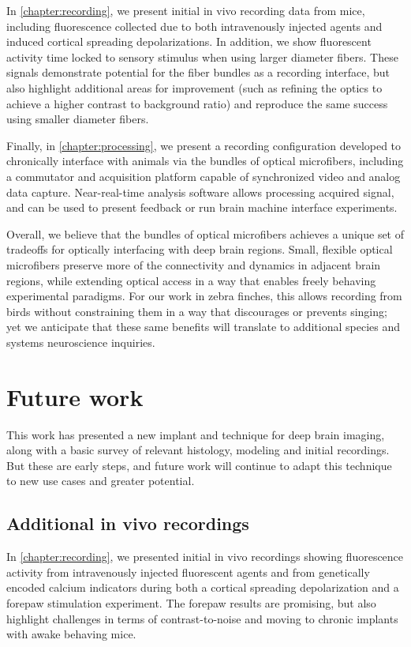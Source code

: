 In \cref{chapter:recording}, we present initial 
in vivo recording data from mice, including fluorescence 
collected due to both intravenously injected agents 
and induced cortical spreading depolarizations. 
In addition, we show fluorescent activity time 
locked to sensory stimulus when using larger diameter 
fibers. These signals demonstrate potential for the 
fiber bundles as a recording interface, but also 
highlight additional areas for improvement (such 
as refining the optics to achieve a higher 
contrast to background ratio) and 
reproduce the same success using smaller 
diameter fibers.

Finally, in \cref{chapter:processing}, we 
present a recording configuration developed to chronically 
interface with animals via the bundles of optical 
microfibers, including a commutator and acquisition 
platform capable of synchronized video and analog 
data capture. Near-real-time analysis software 
allows processing acquired signal, and can be 
used to present feedback or run brain machine 
interface experiments.

Overall, we believe that the bundles of optical 
microfibers achieves a unique set of tradeoffs 
for optically interfacing with deep brain regions. 
Small, flexible optical microfibers preserve 
more of the connectivity and dynamics in adjacent 
brain regions, while extending optical access in a 
way that enables freely behaving experimental 
paradigms. For our work in zebra finches, this 
allows recording from birds without constraining 
them in a way that discourages or prevents singing; 
yet we anticipate that these same benefits will 
translate to additional species and systems 
neuroscience inquiries.

\section{Future work}

This work has presented a new implant and technique
for deep brain imaging, along with a basic survey of 
relevant histology, modeling and initial recordings. 
But these are early steps, and future work will 
continue to adapt this technique to new use cases
and greater potential.

\subsection{Additional in vivo recordings}

In \cref{chapter:recording}, we presented initial 
in vivo recordings showing fluorescence activity 
from intravenously injected fluorescent agents and 
from genetically encoded calcium indicators during 
both a cortical spreading depolarization and a 
forepaw stimulation experiment. The forepaw results 
are promising, but also highlight challenges in 
terms of contrast-to-noise and moving to chronic 
implants with awake behaving mice.

